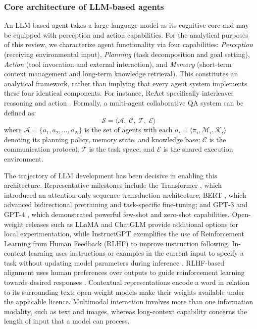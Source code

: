 \documentclass[a4paper,fleqn]{cas-dc}
\begin{document}
\subsubsection{Core architecture of LLM-based agents}
\label{sec:agent_arch}

An LLM-based agent takes a large language model as its cognitive core and may be equipped with perception and action capabilities. For the analytical purposes of this review, we characterize agent functionality via four capabilities: \emph{Perception} (receiving environmental input), \emph{Planning} (task decomposition and goal setting), \emph{Action} (tool invocation and external interaction), and \emph{Memory} (short-term context management and long-term knowledge retrieval). This constitutes an analytical framework, rather than implying that every agent system implements these four identical components. For instance, ReAct specifically interleaves reasoning and action \citep{yao2023react}.
Formally, a multi-agent collaborative QA system can be defined as:
\begin{equation}
  \mathcal{S} = \langle \mathcal{A},\; \mathcal{C},\; \mathcal{T},\;
                \mathcal{E} \rangle
  \label{eq:mas_def}
\end{equation}
\noindent where $\mathcal{A} = \{a_1, a_2, \ldots, a_N\}$ is the set of
agents with each $a_i = \langle \pi_i, \mathcal{M}_i, \mathcal{K}_i
\rangle$ denoting its planning policy, memory state, and knowledge base;
$\mathcal{C}$ is the communication protocol; $\mathcal{T}$ is the task
space; and $\mathcal{E}$ is the shared execution environment.

The trajectory of LLM development has been decisive in enabling this architecture.
Representative milestones include the Transformer \citep{vaswani2017attention},
which introduced an attention-only sequence-transduction architecture; BERT
\citep{devlin2019bert}, which advanced bidirectional pretraining and
task-specific fine-tuning; and GPT-3 \citep{brown2020gpt3} and GPT-4
\citep{openai2023gpt4}, which demonstrated powerful few-shot and zero-shot
capabilities. Open-weight releases such as LLaMA \citep{touvron2023llama} and
ChatGLM \citep{glm2024chatglm} provide additional options for local
experimentation, while
InstructGPT \citep{ouyang2022instructgpt} exemplifies the use of Reinforcement
Learning from Human Feedback (RLHF) to improve instruction following.
In-context learning uses instructions or examples in the current input to
specify a task without updating model parameters during inference
\citep{brown2020gpt3}. RLHF-based alignment uses human preferences over
outputs to guide reinforcement learning towards desired responses
\citep{ouyang2022instructgpt}. Contextual representations encode a word in
relation to its surrounding text; open-weight models make their weights
available under the applicable licence. Multimodal interaction involves
more than one information modality, such as text and images, whereas
long-context capability concerns the length of input that a model can process.
\end{document}
